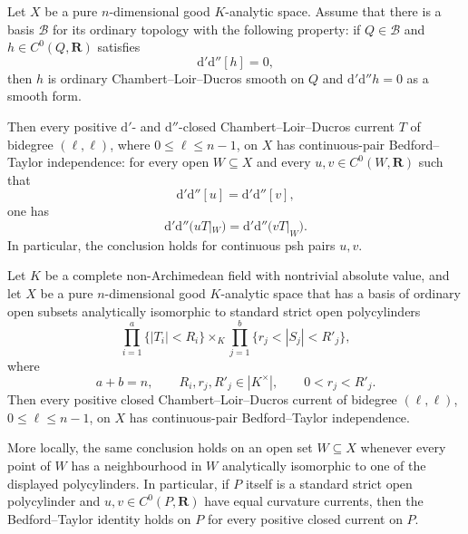 
\begin{proposition}\label{prop:p213-hessian-regular-basis-candidate}
Let \(X\) be a pure \(n\)-dimensional good \(K\)-analytic space.  Assume that
there is a basis \(\mathscr B\) for its ordinary topology with the following
property: if \(Q\in\mathscr B\) and \(h\in C^0(Q,\mathbf R)\) satisfies
\[
                 \mathrm d'\mathrm d''[h]=0,
\]
then \(h\) is ordinary Chambert--Loir--Ducros smooth on \(Q\) and
\(\mathrm d'\mathrm d''h=0\) as a smooth form.

Then every positive \(\mathrm d'\)- and \(\mathrm d''\)-closed
Chambert--Loir--Ducros current \(T\) of bidegree \((\ell,\ell)\), where
\(0\leq\ell\leq n-1\), on \(X\) has continuous-pair
Bedford--Taylor independence: for every open \(W\subseteq X\) and every
\(u,v\in C^0(W,\mathbf R)\) such that
\[
                 \mathrm d'\mathrm d''[u]
                 =\mathrm d'\mathrm d''[v],
\]
one has
\[
 \mathrm d'\mathrm d''\bigl(uT|_W\bigr)
 =\mathrm d'\mathrm d''\bigl(vT|_W\bigr).
\]
In particular, the conclusion holds for continuous psh pairs \(u,v\).
\end{proposition}

\begin{corollary}\label{cor:p213-polycylinder-basis-candidate}
Let \(K\) be a complete non-Archimedean field with nontrivial absolute
value, and let \(X\) be a pure \(n\)-dimensional good \(K\)-analytic space that
has a basis of ordinary open subsets analytically isomorphic to standard
strict open polycylinders
\[
 \prod_{i=1}^{a}\{|T_i|<R_i\}
 \times_K
 \prod_{j=1}^{b}\{r_j<|S_j|<R'_j\},
\]
where
\[
 a+b=n,\qquad
 R_i,r_j,R'_j\in|K^\times|,
 \qquad 0<r_j<R'_j.
\]
Then every positive closed Chambert--Loir--Ducros current of bidegree
\((\ell,\ell)\), \(0\leq\ell\leq n-1\), on \(X\) has continuous-pair
Bedford--Taylor independence.

More locally, the same conclusion holds on an open set \(W\subseteq X\)
whenever every point of \(W\) has a neighbourhood in \(W\) analytically
isomorphic to one of the displayed polycylinders.  In particular, if \(P\)
itself is a standard strict open polycylinder and
\(u,v\in C^0(P,\mathbf R)\) have equal curvature currents, then the
Bedford--Taylor identity holds on \(P\) for every positive closed current
on \(P\).
\end{corollary}
